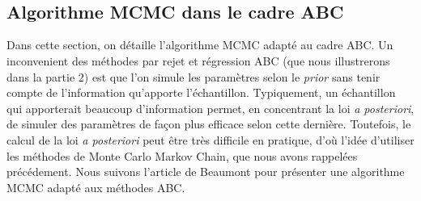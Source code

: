 \documentclass{article}
\theoremstyle{definition}
\begin{document}
\\
\\

\subsection{Algorithme MCMC dans le cadre ABC}

Dans cette section, on détaille l'algorithme MCMC adapté au cadre ABC. Un inconvenient des méthodes par rejet et régression ABC (que nous illustrerons dans la partie 2) est que l'on simule les paramètres selon le \textit{prior} sans tenir compte de l'information qu'apporte l'échantillon. Typiquement, un échantillon qui apporterait beaucoup d'information permet, en concentrant la loi \textit{a posteriori}, de simuler des paramètres de façon plus efficace selon cette dernière. Toutefois, le calcul de la loi \textit{a posteriori} peut être très difficile en pratique, d'où l'idée d'utiliser les méthodes de Monte Carlo Markov Chain, que nous avons rappelées précédement. Nous suivons l'article de Beaumont pour présenter une algorithme MCMC adapté aux méthodes ABC. \\
\end{document}

